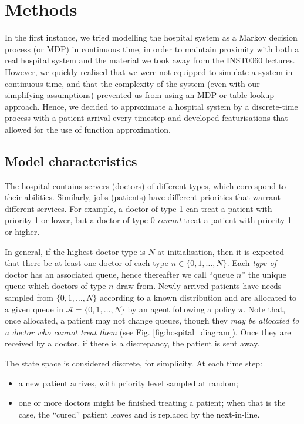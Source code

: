 \documentclass[11point]{article}
\begin{document}
\section{Methods}

In the first instance, we tried modelling the hospital system as a Markov decision process (or MDP) in continuous time, in order to maintain proximity with both a real hospital system and the material we took away from the INST0060 lectures.
However, we quickly realised that we were not equipped to simulate a system in continuous time,
and that the complexity of the system (even with our simplifying assumptions) prevented us from using an MDP or table-lookup approach.
Hence, we decided to approximate a hospital system by a discrete-time process with a patient arrival every timestep and developed featurisations that allowed for the use of function approximation.

\subsection{Model characteristics}
The hospital contains servers (doctors) of different types, which correspond to their abilities.
Similarly, jobs (patients) have different priorities that warrant different services.
For example, a doctor of type 1 can treat a patient with priority 1 or lower, but a doctor of type 0 \emph{cannot} treat a patient with priority 1 or higher.

In general, if the highest doctor type is $N$ at initialisation, then it is expected that there be at least one doctor of each type $n\in \{0,1,\ldots,N\}$.
Each \emph{type of} doctor has an associated queue, hence thereafter we call ``queue $n$'' the unique queue which doctors of type $n$ draw from.
Newly arrived patients have needs sampled from $\{0,1,\ldots,N\}$ according to a known distribution and are allocated to a given queue in $\mathcal{A}=\{0,1,\ldots,N\}$ by an agent following a policy $\pi$.
Note that, once allocated, a patient may not change queues, though they \emph{may be allocated to a doctor who cannot treat them} (see Fig. \ref{fig:hospital_diagram}).
Once they are received by a doctor, if there is a discrepancy, the patient is sent away.

The state space is considered discrete, for simplicity. At each time step:
\begin{itemize}[nosep]
    \item a new patient arrives, with priority level sampled at random; 
    \item one or more doctors might be finished treating a patient; when that is the case, the ``cured'' patient leaves and is replaced by the next-in-line. 
\end{itemize}
\end{document}
